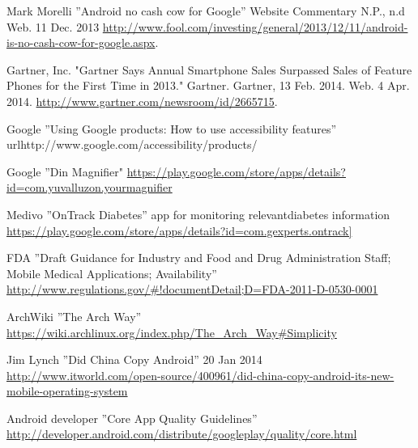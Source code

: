 \documentclass[conference]{IEEEtran}
\begin{document}
\begin{thebibliography}{1}
Mark Morelli ''Android no cash cow for Google'' Website Commentary N.P., n.d Web. 11 Dec. 2013 \url{http://www.fool.com/investing/general/2013/12/11/android-is-no-cash-cow-for-google.aspx}.

Gartner, Inc. "Gartner Says Annual Smartphone Sales Surpassed Sales of Feature Phones for the First Time in 2013." Gartner. Gartner, 13 Feb. 2014. Web. 4 Apr. 2014. \url{http://www.gartner.com/newsroom/id/2665715}.

Google ''Using Google products: How to use accessibility features'' url{http://www.google.com/accessibility/products/}

Google ''Din Magnifier" \url{https://play.google.com/store/apps/details?id=com.yuvalluzon.yourmagnifier}

Medivo ''OnTrack Diabetes'' app for monitoring relevantdiabetes information
\url{https://play.google.com/store/apps/details?id=com.gexperts.ontrack]}

FDA ''Draft Guidance for Industry and Food and Drug Administration Staff; Mobile Medical Applications; Availability''
\url{http://www.regulations.gov/#!documentDetail;D=FDA-2011-D-0530-0001}

ArchWiki ''The Arch Way'' \url{https://wiki.archlinux.org/index.php/The\_Arch\_Way#Simplicity}





Jim Lynch ''Did China Copy Android''  20 Jan 2014 \url{http://www.itworld.com/open-source/400961/did-china-copy-android-its-new-mobile-operating-system} 

Android developer ''Core App Quality Guidelines''
\url{http://developer.android.com/distribute/googleplay/quality/core.html}

\end{thebibliography}
\end{document}

